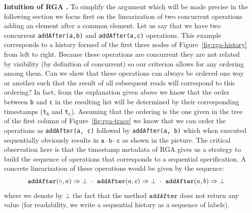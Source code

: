 \smallskip
\noindent
{\bf Intuition of RGA \CRDTLinshort{}.}
To simplify the argument which will be made precise in the following
section we focus first on the linearization of two concurrent
operations adding an element after a common element.
%
Let us say that we have two concurrent \lstinline|addAfter(a,b)| and
\lstinline|addAfter(a,c)| operations.
%
This example corresponds to a history formed of the first three nodes
of Figure~\ref{fig:rga-history} from left to right.
%
Because these operations are concurrent they are not related by
visibility (by definition of concurrent) so our criterion allows for
any ordering among them.
%
Can we show that these operations can always be ordered one way or
another such that the result of all subsequent reads will correspond
to this ordering?
%
In fact, from the explanation given above we know that the order
between \lstinline|b| and \lstinline|c| in the resulting list will be
determined by their corresponding timestamps
(\lstinline|t|$_{\mathtt{b}}$ and \lstinline|t|$_{\mathtt{c}}$).
%
Assuming that the ordering is the one given in the tree of the first
column of Figure~\ref{fig:rga-trace} we know that we can order the
operations as \lstinline|addAfter(a, c)| followed by
\lstinline|addAfter(a, b)| which when executed sequentially obviously
results in $\mathtt{a \cdot b \cdot c}$ as shown in the picture.
%
The critical observation here is that the timestamp metadata of RGA
gives us a strategy to build the sequence of operations that
corresponds to a sequential specification.
%
A concrete linearization of these operations would be given by the
sequence:
\[\alabellong[\mathtt{addAfter}]{\circ,a}{\bot}\ \cdot\
\alabellong[\mathtt{addAfter}]{a,c}{\bot}\ \cdot\
\alabellong[\mathtt{addAfter}]{a,b}{\bot}
\]
where we denote by $\bot$ the fact that the method $\mathtt{addAfter}$
does not return any value (for readability, we write a sequential history as a sequence of labels).
%

